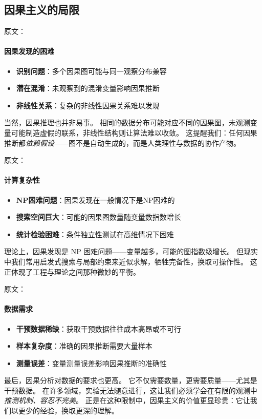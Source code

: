 \subsection{因果主义的局限}

原文：
\paragraph{因果发现的困难}
\begin{itemize}
\item \textbf{识别问题}：多个因果图可能与同一观察分布兼容
\item \textbf{潜在混淆}：未观察到的混淆变量影响因果推断
\item \textbf{非线性关系}：复杂的非线性因果关系难以发现
\end{itemize}
当然，因果推理也并非易事。  
相同的数据分布可能对应不同的因果图，未观测变量可能制造虚假的联系，非线性结构则让算法难以收敛。  
这提醒我们：任何因果推断都\emph{依赖假设}——图不是自动生成的，而是人类理性与数据的协作产物。

原文：
\paragraph{计算复杂性}
\begin{itemize}
\item \textbf{NP困难问题}：因果发现在一般情况下是NP困难的
\item \textbf{搜索空间巨大}：可能的因果图数量随变量数指数增长
\item \textbf{统计检验困难}：条件独立性测试在高维情况下困难
\end{itemize}
理论上，因果发现是 NP 困难问题——变量越多，可能的图指数级增长。  
但现实中我们常用启发式搜索与局部约束来近似求解，牺牲完备性，换取可操作性。  
这正体现了工程与理论之间那种微妙的平衡。

原文：
\paragraph{数据需求}
\begin{itemize}
\item \textbf{干预数据稀缺}：获取干预数据往往成本高昂或不可行
\item \textbf{样本复杂度}：准确的因果推断需要大量样本
\item \textbf{测量误差}：变量测量误差影响因果推断的准确性
\end{itemize}
最后，因果分析对数据的要求也更高。  
它不仅需要数量，更需要质量——尤其是干预数据。  
在许多领域，实验无法随意进行，这让我们必须学会在有限的观测中\emph{推测机制、容忍不完美}。  
正是在这种限制中，因果主义的价值更显珍贵：它让我们以更少的经验，换取更深的理解。

